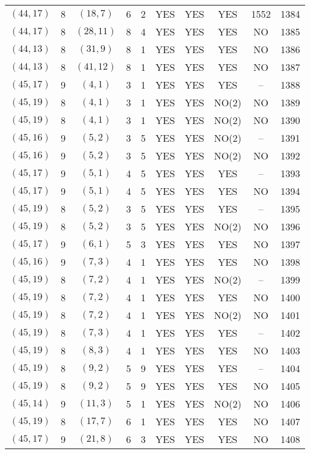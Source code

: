 \begin{longtable}{|c|c|c|c|c|c|c|c|c|c|}
$(44, 17)$ & 8 & $(18, 7)$ & 6 & 2 & YES & YES & YES & 1552 & 1384\\
$(44, 17)$ & 8 & $(28, 11)$ & 8 & 4 & YES & YES & YES & NO & 1385\\
$(44, 13)$ & 8 & $(31, 9)$ & 8 & 1 & YES & YES & YES & NO & 1386\\
$(44, 13)$ & 8 & $(41, 12)$ & 8 & 1 & YES & YES & YES & NO & 1387\\
$(45, 17)$ & 9 & $(4, 1)$ & 3 & 1 & YES & YES & YES & -- & 1388\\
$(45, 19)$ & 8 & $(4, 1)$ & 3 & 1 & YES & YES & NO(2) & NO & 1389\\
$(45, 19)$ & 8 & $(4, 1)$ & 3 & 1 & YES & YES & NO(2) & NO & 1390\\
$(45, 16)$ & 9 & $(5, 2)$ & 3 & 5 & YES & YES & NO(2) & -- & 1391\\
$(45, 16)$ & 9 & $(5, 2)$ & 3 & 5 & YES & YES & NO(2) & NO & 1392\\
$(45, 17)$ & 9 & $(5, 1)$ & 4 & 5 & YES & YES & YES & -- & 1393\\
$(45, 17)$ & 9 & $(5, 1)$ & 4 & 5 & YES & YES & YES & NO & 1394\\
$(45, 19)$ & 8 & $(5, 2)$ & 3 & 5 & YES & YES & YES & -- & 1395\\
$(45, 19)$ & 8 & $(5, 2)$ & 3 & 5 & YES & YES & NO(2) & NO & 1396\\
$(45, 17)$ & 9 & $(6, 1)$ & 5 & 3 & YES & YES & YES & NO & 1397\\
$(45, 16)$ & 9 & $(7, 3)$ & 4 & 1 & YES & YES & YES & NO & 1398\\
$(45, 19)$ & 8 & $(7, 2)$ & 4 & 1 & YES & YES & NO(2) & -- & 1399\\
$(45, 19)$ & 8 & $(7, 2)$ & 4 & 1 & YES & YES & YES & NO & 1400\\
$(45, 19)$ & 8 & $(7, 2)$ & 4 & 1 & YES & YES & NO(2) & NO & 1401\\
$(45, 19)$ & 8 & $(7, 3)$ & 4 & 1 & YES & YES & YES & -- & 1402\\
$(45, 19)$ & 8 & $(8, 3)$ & 4 & 1 & YES & YES & YES & NO & 1403\\
$(45, 19)$ & 8 & $(9, 2)$ & 5 & 9 & YES & YES & YES & -- & 1404\\
$(45, 19)$ & 8 & $(9, 2)$ & 5 & 9 & YES & YES & YES & NO & 1405\\
$(45, 14)$ & 9 & $(11, 3)$ & 5 & 1 & YES & YES & NO(2) & NO & 1406\\
$(45, 19)$ & 8 & $(17, 7)$ & 6 & 1 & YES & YES & YES & NO & 1407\\
$(45, 17)$ & 9 & $(21, 8)$ & 6 & 3 & YES & YES & YES & NO & 1408\\

\end{longtable}
